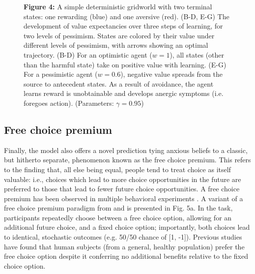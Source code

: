 \documentclass[11pt]{article} %
\begin{document}
\begin{figure}[!b]
  \centerline{%
  }
  \par \textbf{Figure 4:} A simple deterministic gridworld with two terminal states: one rewarding (blue) and one aversive (red). (B-D, E-G) The development of value expectancies over three steps of learning, for two levels of pessimism.
  States are colored by their value under different levels of pessimism, with arrows showing an optimal trajectory. (B-D) For an optimistic agent ($w=1$), all states (other than the harmful state) take on positive value with learning. (E-G) For a pessimistic agent ($w=0.6$), negative value spreads from the source to antecedent states. As a result of avoidance, the agent learns reward is unobtainable and develops anergic symptoms (i.e. foregoes action). (Parameters: $\gamma = 0.95$)
\end{figure}

\subsection{Free choice premium}

Finally, the model also offers a novel prediction tying anxious beliefs to a classic, but hitherto separate, phenomenon known as the free choice premium. This refers to the finding that, all else being equal, people tend to treat choice as itself valuable: i.e., choices which lead to more choice opportunities in the future are preferred to those that lead to fewer future choice opportunities. A free choice premium has been observed in multiple behavioral experiments \cite{Leotti2010, ly2019}. A variant of a free choice premium paradigm from \cite{Leotti2011} and \cite{Leotti2014} is presented in Fig. 5a. In the task, participants repeatedly choose between a free choice option, allowing for an additional future choice, and a fixed choice option; importantly, both choices lead to identical, stochastic outcomes (e.g. 50/50 chance of [1, -1]). Previous studies have found that human subjects (from a general, healthy population) prefer the free choice option despite it conferring no additional benefits relative to the fixed choice option. 
\end{document}

